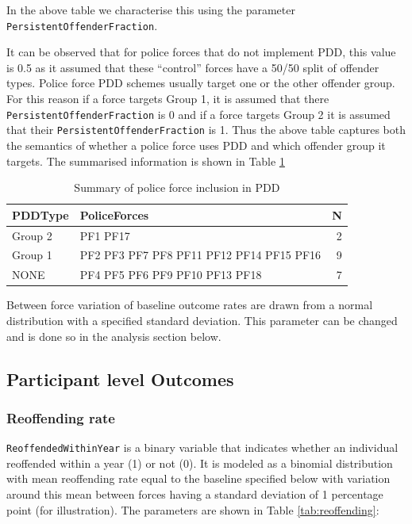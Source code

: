 \documentclass[
]{article}
\begin{document}
In the above table we characterise this using the parameter \texttt{PersistentOffenderFraction}.

It can be observed that for police forces that do not implement PDD, this value is 0.5 as it assumed that these ``control'' forces have a 50/50 split of offender types. Police force PDD schemes usually target one or the other offender group. For this reason if a force targets Group 1, it is assumed that there \texttt{PersistentOffenderFraction} is 0 and if a force targets Group 2 it is assumed that their \texttt{PersistentOffenderFraction} is 1. Thus the above table captures both the semantics of whether a police force uses PDD and which offender group it targets. The summarised information is shown in Table \ref{tab:pddSummary}

\begin{table}[H]

\caption{\label{tab:pddSummary}Summary of police force inclusion in PDD}
\centering
\begin{tabular}[t]{llr}
\toprule
PDDType & PoliceForces & N\\
\midrule
Group 2 & PF1 PF17 & 2\\
Group 1 & PF2 PF3 PF7 PF8 PF11 PF12 PF14 PF15 PF16 & 9\\
NONE & PF4 PF5 PF6 PF9 PF10 PF13 PF18 & 7\\
\bottomrule
\end{tabular}
\end{table}

Between force variation of baseline outcome rates are drawn from a normal distribution with a specified standard deviation. This parameter can be changed and is done so in the analysis section below.

\hypertarget{participant-level-outcomes}{%
\subsection{Participant level Outcomes}\label{participant-level-outcomes}}

\hypertarget{reoffending-rate}{%
\subsubsection{Reoffending rate}\label{reoffending-rate}}

\texttt{ReoffendedWithinYear} is a binary variable that indicates whether an individual reoffended within a year (1) or not (0). It is modeled as a binomial distribution with mean reoffending rate equal to the baseline specified below with variation around this mean between forces having a standard deviation of 1 percentage point (for illustration). The parameters are shown in Table \ref{tab:reoffending}:
\end{document}
